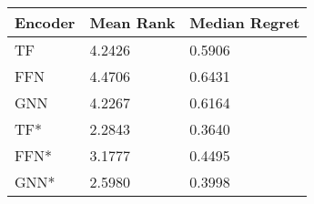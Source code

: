 \begin{tabular}{lll}
\toprule
Encoder & Mean Rank & Median Regret \\
\midrule
TF & 4.2426 & 0.5906 \\
FFN & 4.4706 & 0.6431 \\
GNN & 4.2267 & 0.6164 \\
TF* & 2.2843 & 0.3640 \\
FFN* & 3.1777 & 0.4495 \\
GNN* & 2.5980 & 0.3998 \\
\bottomrule
\end{tabular}
